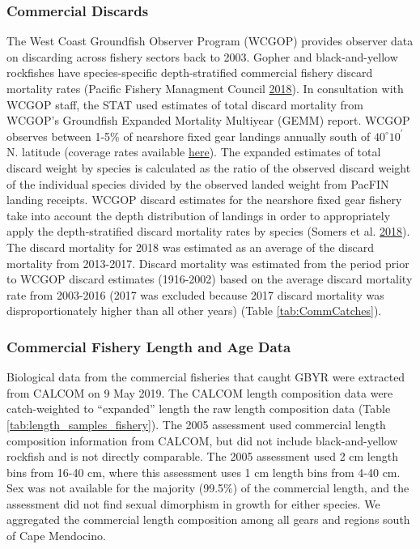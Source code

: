 \documentclass[12pt,]{article}
\begin{document}
\subsubsection{Commercial Discards}\label{commercial-discards}

The West Coast Groundfish Observer Program (WCGOP) provides observer
data on discarding across fishery sectors back to 2003. Gopher and
black-and-yellow rockfishes have species-specific depth-stratified
commercial fishery discard mortality rates (Pacific Fishery Managment
Council \protect\hyperlink{ref-PSMFC2018}{2018}). In consultation with
WCGOP staff, the STAT used estimates of total discard mortality from
WCGOP's Groundfish Expanded Mortality Multiyear (GEMM) report. WCGOP
observes between 1-5\% of nearshore fixed gear landings annually south
of \(40^\circ 10^\prime\) N. latitude (coverage rates available
\href{https://www.nwfsc.noaa.gov/research/divisions/fram/observation/data_products/sector_products.cfm\#ob}{here}).
The expanded estimates of total discard weight by species is calculated
as the ratio of the observed discard weight of the individual species
divided by the observed landed weight from PacFIN landing receipts.
WCGOP discard estimates for the nearshore fixed gear fishery take into
account the depth distribution of landings in order to appropriately
apply the depth-stratified discard mortality rates by species (Somers et
al. \protect\hyperlink{ref-Somers2018}{2018}). The discard mortality for
2018 was estimated as an average of the discard mortality from
2013-2017. Discard mortality was estimated from the period prior to
WCGOP discard estimates (1916-2002) based on the average discard
mortality rate from 2003-2016 (2017 was excluded because 2017 discard
mortality was disproportionately higher than all other years) (Table
\ref{tab:CommCatches}).

\subsubsection{Commercial Fishery Length and Age
Data}\label{commercial-fishery-length-and-age-data}

Biological data from the commercial fisheries that caught GBYR were
extracted from CALCOM on 9 May 2019. The CALCOM length composition data
were catch-weighted to ``expanded'' length the raw length composition
data (Table \ref{tab:length_samples_fishery}). The 2005 assessment used
commercial length composition information from CALCOM, but did not
include black-and-yellow rockfish and is not directly comparable. The
2005 assessment used 2 cm length bins from 16-40 cm, where this
assessment uses 1 cm length bins from 4-40 cm. Sex was not available for
the majority (99.5\%) of the commercial length, and the assessment did
not find sexual dimorphism in growth for either species. We aggregated
the commercial length composition among all gears and regions south of
Cape Mendocino.
\end{document}
